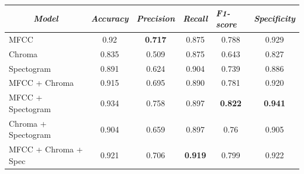 \documentclass[a4paper, 12pt]{article}
\begin{document}
\begin{table}[!h]
\centering
\begin{tabular}{|l|c|c|c|c|c|}
\hline
\multicolumn{1}{|c|}{\textit{\textbf{Model}}} & \multicolumn{1}{l|}{\textit{\textbf{Accuracy}}} & \multicolumn{1}{l|}{\textit{\textbf{Precision}}} & \multicolumn{1}{l|}{\textit{\textbf{Recall}}} & \multicolumn{1}{l|}{\textit{\textbf{F1-score}}} & \multicolumn{1}{l|}{\textit{\textbf{Specificity}}} \\ \hline
MFCC                                          & 0.92                                            & \textbf{0.717}                                   & 0.875                                         & 0.788                                           & 0.929                                              \\ \hline
Chroma                                        & 0.835                                           & 0.509                                            & 0.875                                         & 0.643                                           & 0.827                                              \\ \hline
Spectogram                                    & 0.891                                           & 0.624                                            & 0.904                                         & 0.739                                           & 0.886                                              \\ \hline
MFCC + Chroma                                 & 0.915                                           & 0.695                                            & 0.890                                         & 0.781                                           & 0.920                                              \\ \hline
MFCC + Spectogram                             & 0.934                                           & 0.758                                            & 0.897                                         & \textbf{0.822}                                  & \textbf{0.941}                                     \\ \hline
Chroma + Spectogram                           & 0.904                                           & 0.659                                            & 0.897                                         & 0.76                                            & 0.905                                              \\ \hline
MFCC + Chroma + Spec                    & 0.921                                           & 0.706                                            & \textbf{0.919}                                & 0.799                                           & 0.922                                              \\ \hline

\end{tabular}
\end{table}
\end{document}
